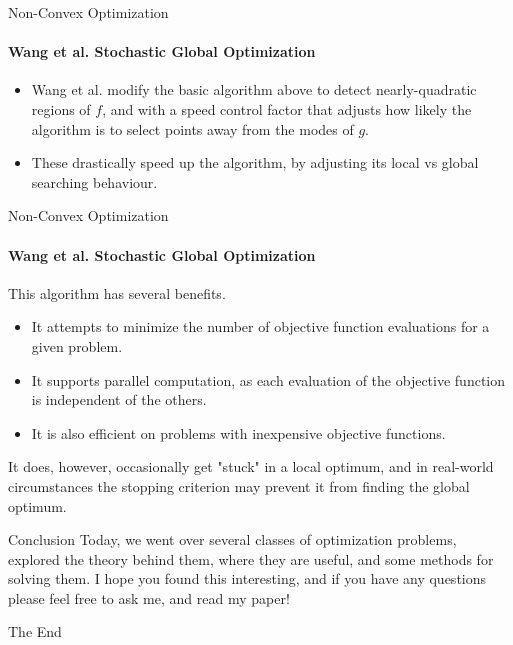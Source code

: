 \documentclass{beamer}
\begin{document}
	\begin{frame}{Non-Convex Optimization}
		\framesubtitle{Wang et al. Stochastic Global Optimization}
		\begin{itemize}
			\item Wang et al. modify the basic algorithm above to detect nearly-quadratic regions of $f$, and with a speed control factor that adjusts how likely the algorithm is to select points away from the modes of $g$.
			\item These drastically speed up the algorithm, by adjusting its local vs global searching behaviour.
		\end{itemize}
	\end{frame}

	\begin{frame}{Non-Convex Optimization}
		\framesubtitle{Wang et al. Stochastic Global Optimization}
		This algorithm has several benefits.
		\begin{itemize}
			\item It attempts to minimize the number of objective function evaluations for a given problem.
			\item It supports parallel computation, as each evaluation of the objective function is independent of the others.
			\item It is also efficient on problems with inexpensive objective functions.
		\end{itemize}
		It does, however, occasionally get "stuck" in a local optimum, and in real-world circumstances the stopping criterion may prevent it from finding the global optimum.
	\end{frame}
	
	\begin{frame}{Conclusion}
		Today, we went over several classes of optimization problems, explored the theory behind them, where they are useful, and some methods for solving them.
		I hope you found this interesting, and if you have any questions please feel free to ask me, and read my paper!
		\huge{\centerline{The End}}
	\end{frame}
	
\end{document}
